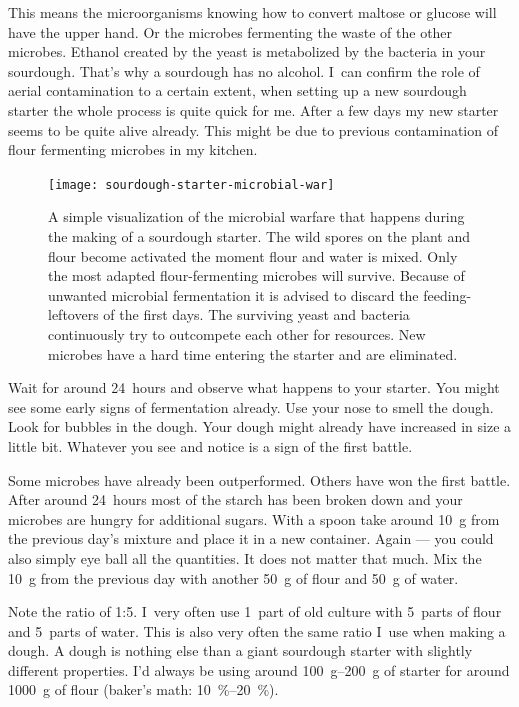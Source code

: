 This means the microorganisms knowing
how to convert maltose or glucose will have the upper hand. Or the
microbes fermenting the waste of the other microbes. Ethanol created
by the yeast is metabolized by the bacteria in your sourdough. That's
why a sourdough has no alcohol. I~can confirm the role of aerial
contamination to a certain extent, when setting up a new sourdough
starter the whole process is quite quick for me. After a few
days my new starter seems to be quite alive already. This might
be due to previous contamination of flour fermenting microbes in
my kitchen.

\begin{figure}[!htb]
  \texttt{[image: sourdough-starter-microbial-war]}
  \caption[Microbial warfare during sourdough early days]{A simple
      visualization of the microbial warfare that happens during the making of
      a sourdough starter. The wild spores on the plant and flour become
      activated the moment flour and water is mixed.  Only the most adapted
      flour-fermenting microbes will survive. Because of unwanted microbial
      fermentation it is advised to discard the feeding-leftovers of the first
      days. The surviving yeast and bacteria continuously try to outcompete
      each other for resources. New microbes have a hard time entering the
      starter and are eliminated.}%
  \label{fig:sourdough-starter-microbial-war}
\end{figure}

Wait for around 24~hours and observe what happens to your starter.
You might see some early signs of fermentation already. Use your nose
to smell the dough. Look for bubbles in the dough. Your dough
might already have increased in size a little bit. Whatever
you see and notice is a sign of the first battle.

Some microbes
have already been outperformed. Others have won the first battle.
After around 24~hours most of the starch has been broken down
and your microbes are hungry for additional sugars. With a spoon
take around \qty{10}{\gram} from the previous day's mixture and place
it in a new container. Again --- you could also simply eye ball
all the quantities. It does not matter that much. Mix the \qty{10}{\gram}
from the previous day with another \qty{50}{\gram} of flour
and \qty{50}{\gram} of water. 

Note the ratio of 1:5. I~very often use
1~part of old culture with 5~parts of flour and 5~parts of water.
This is also very often the same ratio I~use when making a dough.
A dough is nothing else than a giant sourdough starter with slightly different
properties. I'd always be using around \qtyrange{100}{200}{\gram} of starter
for around \qty{1000}{\gram} of flour (baker's math: \qtyrange{10}{20}{\percent}).

